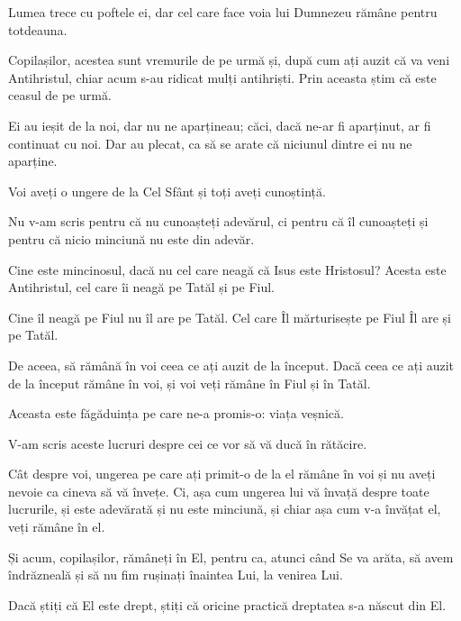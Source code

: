 {Lumea trece cu poftele ei, dar cel care face voia lui Dumnezeu rămâne pentru totdeauna.


\par }{\PP {}Copilașilor, acestea sunt vremurile de pe urmă și, după cum ați auzit că va veni Antihristul, chiar acum s-au ridicat mulți antihriști. Prin aceasta știm că este ceasul de pe urmă.

Ei au ieșit de la noi, dar nu ne aparțineau; căci, dacă ne-ar fi aparținut, ar fi continuat cu noi. Dar au plecat, ca să se arate că niciunul dintre ei nu ne aparține.

Voi aveți o ungere de la Cel Sfânt și toți aveți cunoștință.

Nu v-am scris pentru că nu cunoașteți adevărul, ci pentru că îl cunoașteți și pentru că nicio minciună nu este din adevăr.

Cine este mincinosul, dacă nu cel care neagă că Isus este Hristosul? Acesta este Antihristul, cel care îi neagă pe Tatăl și pe Fiul.

Cine îl neagă pe Fiul nu îl are pe Tatăl. Cel care Îl mărturisește pe Fiul Îl are și pe Tatăl.


\par }{\PP {}De aceea, să rămână în voi ceea ce ați auzit de la început. Dacă ceea ce ați auzit de la început rămâne în voi, și voi veți rămâne în Fiul și în Tatăl.

Aceasta este făgăduința pe care ne-a promis-o: viața veșnică.


\par }{\PP {}V-am scris aceste lucruri despre cei ce vor să vă ducă în rătăcire.

Cât despre voi, ungerea pe care ați primit-o de la el rămâne în voi și nu aveți nevoie ca cineva să vă învețe. Ci, așa cum ungerea lui vă învață despre toate lucrurile, și este adevărată și nu este minciună, și chiar așa cum v-a învățat el, veți rămâne în el.


\par }{\PP {}Și acum, copilașilor, rămâneți în El, pentru ca, atunci când Se va arăta, să avem îndrăzneală și să nu fim rușinați înaintea Lui, la venirea Lui.

Dacă știți că El este drept, știți că oricine practică dreptatea s-a născut din El.



\par }
